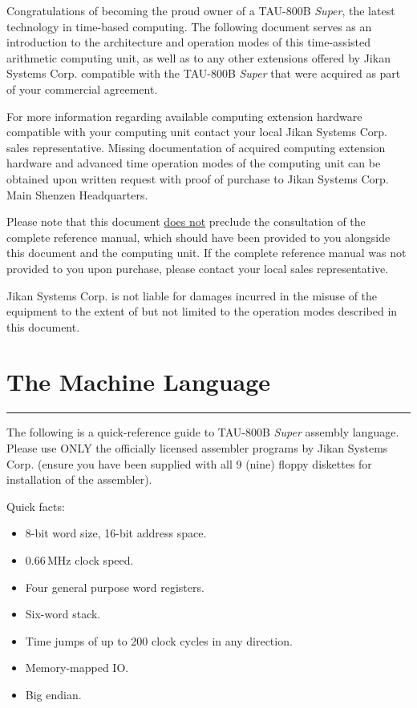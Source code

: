 \documentclass[a5paper,onecolumn,final,10pt]{memoir}
\makeatletter
\let\@copyright@old\copyright
\def\copyright{\makebox[.6ex][l]{\hspace{-.4ex}\textsuperscript{\@copyright@old}}}
\newcommand\machinename%
	{\textsf{TAU-800B \textit{Super}}}
\newcommand\companyname%
	{Jikan Systems Corp.\copyright}
\makeatother
\begin{document}
\noindent
Congratulations of becoming the proud owner of a \machinename{}, the latest technology in time-based computing. The following document serves as an introduction to the architecture and operation modes of this time-assisted arithmetic computing unit, as well as to any other extensions offered by \companyname{} compatible with the \machinename{} that were acquired as part of your commercial agreement.

For more information regarding available computing extension hardware compatible with your computing unit contact your local \companyname{} sales representative. Missing documentation of acquired computing extension hardware and advanced time operation modes of the computing unit can be obtained upon written request with proof of purchase to \companyname{} Main Shenzen Headquarters.

Please note that this document \underline{does not} preclude the consultation of the complete reference manual, which should have been provided to you alongside this document and the computing unit. If the complete reference manual was not provided to you upon purchase, please contact your local sales representative.

\companyname{} is not liable for damages incurred in the misuse of the equipment to the extent of but not limited to the operation modes described in this document.

\clearpage
\section{The Machine Language}
\vspace*{-20pt}\rule{\textwidth}{0.8pt}

\noindent
The following is a quick-reference guide to \machinename{} assembly language. Please use ONLY the officially licensed assembler programs by \companyname{} (ensure you have been supplied with all 9 (nine) floppy diskettes for installation of the assembler).


Quick facts:
\begin{itemize}[nosep]
	\item 8-bit word size, 16-bit address space.
	\item 0.66\,MHz clock speed.
	\item Four general purpose word registers.
	\item Six-word stack.
	\item Time jumps of up to 200 clock cycles in any direction.\footnotemark
	\item Memory-mapped IO.
	\item Big endian.
\end{itemize}
%
\end{document}
